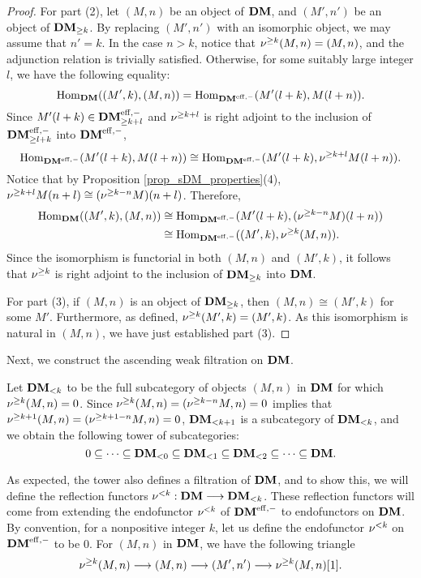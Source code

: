 \begin{proof}
For part (2), let $(M, n)$ be an object of $\DM$, and
$(M', n')$ be an object of $\GFiltDM[k]{\DM}$. By replacing
$(M', n')$ with an isomorphic object, we may assume that
$n' = k$. In the case $n > k$, notice that $\sgDM{k}(M, n) = 
(M, n)$, and the adjunction relation is trivially satisfied.
Otherwise, for some suitably large integer $l$, we have the 
following equality:
\[
\homDM((M', k), (M, n)) = \homDMf(M'(l + k), M(l + n)).
\]
Since $M'(l + k) \in \GFiltDM[k + l]{\DMeff}$ and $\sgDM{k + l}$
is right adjoint to the inclusion of $\GFiltDM[l + k]{\DMeff}$ into
$\DMeff$,
\[
\homDMf(M'(l + k), M(l + n)) \cong \homDMf(M'(l + k), \sgDM{k + l}M(l + n)).
\]
Notice that by Proposition \ref{prop_sDM_properties}(4),
$\sgDM{k + l}M(n + l) \cong (\sgDM{k - n}M)(n + l)$. Therefore,
\begin{align*}
\homDM((M', k), (M, n)) &\cong \homDMf(M'(l + k), (\sgDM{k - n}M)(l + n)) \\
&\cong \homDMf((M', k), \sgDM{k}(M, n)).
\end{align*}
Since the isomorphism is functorial in both $(M, n)$ and 
$(M', k)$, it follows that $\sgDM{k}$ is right adjoint to
the inclusion of $\GFiltDM[k]{\DM}$ into $\DM$.

For part (3), if $(M, n)$ is an object of $\GFiltDM[k]{\DM}$,
then $(M, n) \cong (M', k)$ for some $M'$. Furthermore, as defined,
$\sgDM{k}(M', k) = (M', k)$. As this isomorphism is natural in
$(M, n)$, we have just established part (3).
\end{proof}

Next, we construct the ascending weak filtration on $\DM$.

\begin{defn}\label{def_LFiltDM}
Let $\LFiltDM[k]{\DM}$ to be the full subcategory of 
objects $(M, n)$ in $\DM$ for which $\sgDM{k}(M, n) = 0$. Since
$\sgDM{k}(M, n) = (\sgDM{k - n}M, n) = 0$ implies that 
$\sgDM{k + 1}(M, n) = (\sgDM{k + 1 - n}M, n) = 0$, 
$\LFiltDM[k + 1]{\DM}$ is a subcategory of $\LFiltDM[k]{\DM}$, and
we obtain the following tower of subcategories:
\begin{equation}\label{eq_DM_slice_cofilt}
0 \subseteq \cdots \subseteq \LFiltDM[0]{\DM} \subseteq 
   \LFiltDM[1]{\DM} \subseteq \LFiltDM[2]{\DM} \subseteq \cdots 
   \subseteq \DM.
\end{equation}
\end{defn}

As expected, the tower also defines a filtration of $\DM$, and
to show this, we will define the reflection functors $\slDM{k} : \DM \to 
\LFiltDM[k]{\DM}$. These reflection functors will come from
extending the endofunctor $\slDM{k}$ of $\DMeff$ to endofunctors
on $\DM$. By convention, for a nonpositive integer $k$, let us
define the endofunctor $\slDM{k}$ on $\DMeff$ to be $0$. For 
$(M, n)$ in $\DM$, we have the following triangle
\begin{equation}\label{eq_DM_slice_triangle}
\sgDM{k} (M, n) \to (M, n) \to (M', n') \to \sgDM{k} (M, n)[1].
\end{equation}

